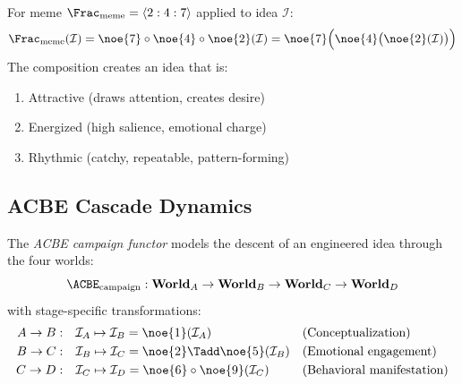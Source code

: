 \begin{proposition}
\label{prop:viral-composition}
For meme $\Frac_{\mathrm{meme}} = \langle 2:4:7 \rangle$ applied to idea $\mathcal{I}$:
\[
    \Frac_{\mathrm{meme}}(\mathcal{I}) = \noe{7} \circ \noe{4} \circ \noe{2}(\mathcal{I})
    = \noe{7}\Bigl( \noe{4}\bigl( \noe{2}(\mathcal{I}) \bigr) \Bigr)
\]
The composition creates an idea that is:
\begin{enumerate}
    \item Attractive (draws attention, creates desire)
    \item Energized (high salience, emotional charge)
    \item Rhythmic (catchy, repeatable, pattern-forming)
\end{enumerate}
\end{proposition}

\subsection{ACBE Cascade Dynamics}

\begin{definition}
\label{def:acbe-campaign}
The \emph{ACBE campaign functor} models the descent of an engineered idea through the four worlds:
\[
    \ACBE_{\mathrm{campaign}} : \mathbf{World}_A \to \mathbf{World}_B \to \mathbf{World}_C \to \mathbf{World}_D
\]
with stage-specific transformations:
\begin{align*}
    A \to B: &\quad \mathcal{I}_A \mapsto \mathcal{I}_B = \noe{1}(\mathcal{I}_A)
    && \text{(Conceptualization)} \\
    B \to C: &\quad \mathcal{I}_B \mapsto \mathcal{I}_C = \noe{2} \Tadd \noe{5}(\mathcal{I}_B)
    && \text{(Emotional engagement)} \\
    C \to D: &\quad \mathcal{I}_C \mapsto \mathcal{I}_D = \noe{6} \circ \noe{9}(\mathcal{I}_C)
    && \text{(Behavioral manifestation)}
\end{align*}
\end{definition}

